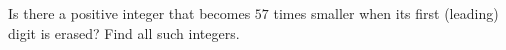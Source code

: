 Is there a positive integer that becomes $57$ times smaller when its first (leading) digit is erased? Find all such integers.
